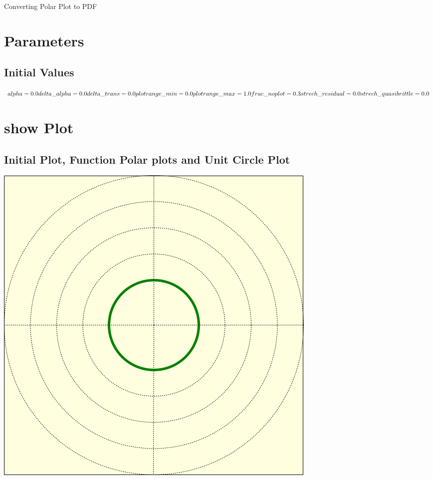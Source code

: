 \documentclass[paper=a4, fleqn]{scrartcl}
\begin{document}
\author{Faeze}

\begin{titlepage}

\begin{center}
Converting Polar Plot to PDF
\end{center}

\section{Parameters}

\subsection{Initial Values}

$alpha = 0.0
\newline
delta\_alpha = 0.0
\newline
delta\_trans = 0.0
\newline
plotrange\_min = 0.0
\newline
plotrange\_max = 1.0
\newline
frac\_noplot = 0.3
\newline
strech\_residual = 0.0
\newline
strech\_quasibrittle = 0.0
\newline
\newline$

\section{show Plot}

\subsection{Initial Plot, Function Polar plots and Unit Circle Plot}

\includegraphics[scale=0.6]{polar_plot_initial.png}


\end{titlepage}
\end{document}
